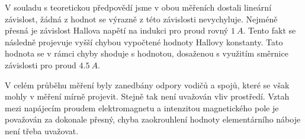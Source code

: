 \documentclass[0-protokol.tex]{subfiles}
\begin{document}
V souladu s teoretickou předpovědí jsme v obou měřeních dostali lineární závislost, žádná z hodnot se výrazně z této závislosti nevychyluje. Nejméně přesná je závislost Hallova napětí na indukci pro proud rovný $\SI{1}{A}$. Tento fakt se následně projevuje vyšší chybou vypočtené hodnoty Hallovy konstanty. Tato hodnota se v rámci chyby shoduje s hodnotou, dosaženou s využitím směrnice závislosti pro proud $\SI{4,5}{A}$.

V celém průběhu měření byly zanedbány odpory vodičů a spojů, které se však mohly v měření mírně projevit. Stejně tak není uvažován vliv prostředí. Vztah mezi napájecím proudem elektromagnetu a intenzitou magnetického pole je považován za dokonale přesný, chyba zaokrouhlení hodnoty elementárního náboje není třeba uvažovat.
\end{document}
